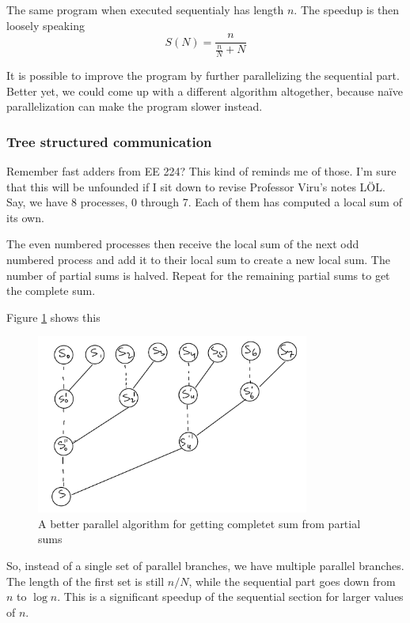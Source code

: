 \documentclass[a4paper]{article}
\begin{document}
The same program when executed sequentialy has length $n$.
The speedup is then loosely speaking
\begin{equation} \label{firstgear}
	S(N) = \frac{n}{\frac{n}{N} + N}
\end{equation}

It is possible
to improve the program by further parallelizing the sequential
part. Better yet, we could come up with a different algorithm altogether,
because na\"ive parallelization can make the program slower instead.

\subsubsection*{Tree structured communication}
Remember fast adders from EE 224? This kind of reminds me of those. I'm
sure that this will be unfounded if I sit down to revise Professor
Viru's notes L\"OL.
Say, we have 8 processes, 0 through 7. Each of them has computed a
local sum of its own. 

The even numbered processes then receive
the local sum of the next odd numbered process and add it to their
local sum to create a new local sum. The number of partial sums is
halved. Repeat for the remaining partial sums to get the complete sum.

Figure \ref{fig:improve} shows this
\begin{figure}[h]
	\centering
	\includegraphics[width=0.8\textwidth]{figures/improve.png}
	\caption{A better parallel algorithm for getting completet sum
	from partial sums}
	\label{fig:improve}
\end{figure}

So, instead of a single set of parallel branches, we have multiple parallel branches.
The length of the first set is still $n / N$, while the sequential
part goes down from $n$ to $\log n$. This is a significant speedup
of the sequential section for larger values of $n$.
\end{document}
